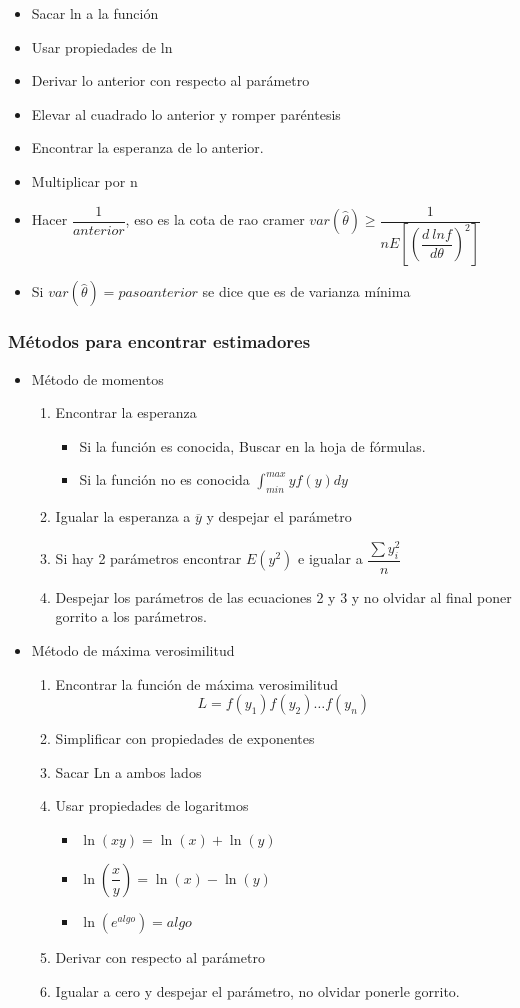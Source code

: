 \begin{itemize}
	\item Sacar ln a la función
	\item Usar propiedades de ln
	\item Derivar lo anterior con respecto al parámetro
	\item Elevar al cuadrado lo anterior y romper paréntesis
	\item Encontrar la esperanza de lo anterior.
	\item Multiplicar por n
	\item Hacer $\dfrac{1}{anterior}$, eso es la cota de rao cramer $var(\hat{\theta})\geq\dfrac{1}{nE[(\dfrac{d\ ln f}{d\theta})^2]}$
	\item Si $var(\hat{\theta})=paso anterior$ se dice que es de varianza mínima
\end{itemize}



\subsubsection{Métodos para encontrar estimadores}

\begin{itemize}
	\item Método de momentos
	\begin{enumerate}
		\item Encontrar la esperanza
		\begin{itemize}
			\item Si la función es conocida, Buscar en la hoja de fórmulas.
			\item Si la función no es conocida $\int_{min}^{max}yf(y)dy$
		\end{itemize}
	\item Igualar la esperanza a $\overline{y}$ y despejar el parámetro
	\item Si hay 2 parámetros encontrar $E(y^2)$ e igualar a $\dfrac{\sum y_i^2}{n}$
	\item Despejar los parámetros de las ecuaciones 2 y 3 y no olvidar al final poner gorrito a los parámetros.
	\end{enumerate}
	\item Método de máxima verosimilitud
	\begin{enumerate}
		\item Encontrar la función de máxima verosimilitud
		$$L=f(y_1)f(y_2)\dots f(y_n)$$
		\item Simplificar con propiedades de exponentes
		\item Sacar Ln a ambos lados
		\item Usar propiedades de logaritmos
		\begin{itemize}
			\item $\ln(xy)=\ln(x)+\ln(y)$
			\item $\ln(\dfrac{x}{y})=\ln(x)-\ln(y)$
			\item $\ln(e^{algo})=algo$
		\end{itemize}
		\item Derivar con respecto al parámetro
		\item Igualar  a cero y despejar el parámetro, no olvidar ponerle gorrito.
	\end{enumerate}
\end{itemize}


